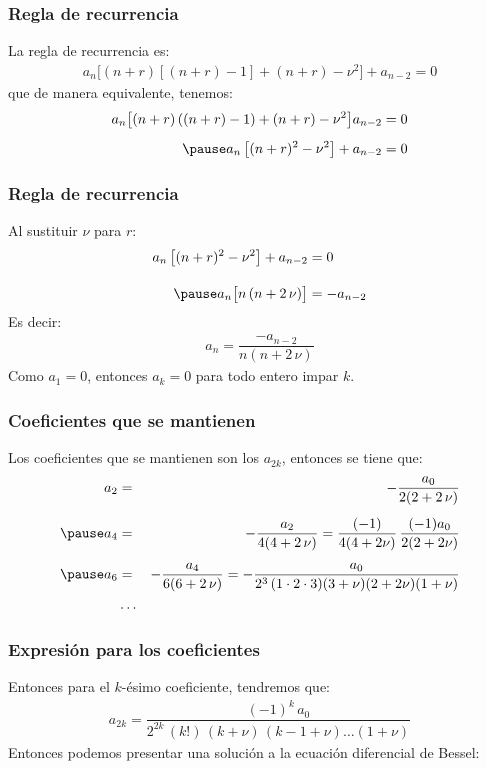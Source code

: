 \documentclass[12pt]{beamer}
\begin{document}
\begin{frame}
\frametitle{Regla de recurrencia}
La regla de recurrencia es:
\pause
\begin{align*}
a_{n} \big[ (n + r) \left[ (n + r) - 1 \right] + (n + r) - \nu^{2} \big] + a_{n-2} = 0
\end{align*}
\pause
que de manera equivalente, tenemos:
\pause
\begin{eqnarray*}
\begin{aligned}
a_{n} \big[ (n + r) \left( (n + r) - 1 \right) + (n + r) - \nu^{2} \big] a_{n-2} &= 0 \\[0.5em] \pause
a_{n} \, \big[ (n + r)^{2} - \nu^{2} \big] + a_{n-2} &= 0
\end{aligned}
\end{eqnarray*}
\end{frame}
\begin{frame}
\frametitle{Regla de recurrencia}
Al sustituir $\nu$ para $r$:
\pause
\begin{eqnarray*}
\begin{aligned}
a_{n} \, \big[ (n + r)^{2} - \nu^{2} \big] + a_{n-2} &= 0 \\[1em] \pause
a_{n} \big[ n \, (n + 2 \, \nu) \big] &= - a_{n-2}
\end{aligned}
\end{eqnarray*}
\pause
Es decir:
\pause
\begin{align*}
a_{n} = \dfrac{- a_{n-2}}{n (n + 2 \, \nu)}
\end{align*}
Como $a_{1} = 0$, entonces $a_{k} = 0$ para todo entero impar $k$.
\end{frame}
\begin{frame}
\frametitle{Coeficientes que se mantienen}
Los coeficientes que se mantienen son los $a_{2 k}$, entonces se tiene que:
\pause
\fontsize{12}{12}\selectfont
\begin{eqnarray*}
a_{2} &=& - \dfrac{a_{0}}{2 (2 + 2 \, \nu)} \\[0.5em]\pause
a_{4} &=& - \dfrac{a_{2}}{4 (4 + 2 \, \nu)} = \dfrac{(-1)}{4 (4 + 2 \nu)} \, \dfrac{(-1)a_{0}}{2 (2 + 2 \nu)} \\[0.5em]\pause
a_{6} &=& - \dfrac{a_{4}}{6 (6 + 2 \, \nu)} = - \dfrac{a_{0}}{2^{3} \, (1 \cdot 2 \cdot 3) (3 + \nu)(2 + 2 \nu)(1 + \nu)}\\
&\ldots&
\end{eqnarray*}
\end{frame}
\begin{frame}
\frametitle{Expresión para los coeficientes}
Entonces para el $k$-ésimo coeficiente, tendremos que:
\pause
\begin{align*}
a_{2k} = \dfrac{(-1)^{k} \, a_{0}}{2^{2 k} \, (k!) \, (k + \nu) \, (k - 1 + \nu) \ldots (1 + \nu)}
\end{align*}
\pause
Entonces podemos presentar una solución a la ecuación diferencial de Bessel:
\end{frame}
\end{document}

